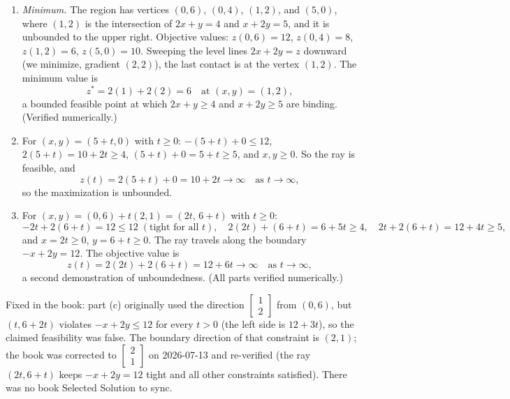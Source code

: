 \begin{enumerate}
\item \emph{Minimum.} The region has vertices $(0,6)$, $(0,4)$, $(1,2)$, and $(5,0)$, where $(1,2)$ is the intersection of $2x + y = 4$ and $x + 2y = 5$, and it is unbounded to the upper right. Objective values: $z(0,6) = 12$, $z(0,4) = 8$, $z(1,2) = 6$, $z(5,0) = 10$. Sweeping the level lines $2x + 2y = z$ downward (we minimize, gradient $(2,2)$), the last contact is at the vertex $(1,2)$. The minimum value is
\[
z^* = 2(1) + 2(2) = 6 \quad \text{at } (x, y) = (1, 2),
\]
a bounded feasible point at which $2x + y \geq 4$ and $x + 2y \geq 5$ are binding. (Verified numerically.)
\item For $(x, y) = (5 + t, 0)$ with $t \geq 0$: $-(5+t) + 0 \leq 12$, $2(5+t) = 10 + 2t \geq 4$, $(5+t) + 0 = 5 + t \geq 5$, and $x, y \geq 0$. So the ray is feasible, and
\[
z(t) = 2(5 + t) + 0 = 10 + 2t \to \infty \quad \text{as } t \to \infty,
\]
so the maximization is unbounded.
\item For $(x, y) = (0, 6) + t(2, 1) = (2t,\, 6 + t)$ with $t \geq 0$:
\[
-2t + 2(6 + t) = 12 \leq 12 \;(\text{tight for all } t), \quad 2(2t) + (6+t) = 6 + 5t \geq 4, \quad 2t + 2(6+t) = 12 + 4t \geq 5,
\]
and $x = 2t \geq 0$, $y = 6 + t \geq 0$. The ray travels along the boundary $-x + 2y = 12$. The objective value is
\[
z(t) = 2(2t) + 2(6 + t) = 12 + 6t \to \infty \quad \text{as } t \to \infty,
\]
a second demonstration of unboundedness. (All parts verified numerically.)
\end{enumerate}

\begin{qaflag}
Fixed in the book: part (c) originally used the direction $\begin{bmatrix}1\\2\end{bmatrix}$ from $(0,6)$, but $(t, 6+2t)$ violates $-x + 2y \leq 12$ for every $t > 0$ (the left side is $12 + 3t$), so the claimed feasibility was false. The boundary direction of that constraint is $(2,1)$; the book was corrected to $\begin{bmatrix}2\\1\end{bmatrix}$ on 2026-07-13 and re-verified (the ray $(2t, 6+t)$ keeps $-x+2y = 12$ tight and all other constraints satisfied). There was no book Selected Solution to sync.
\end{qaflag}

